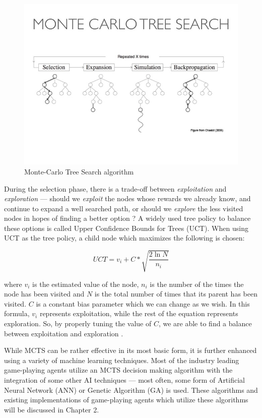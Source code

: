 \begin{figure}[h]
    \centering
    \includegraphics[clip, trim={0 4cm 0 5cm}, scale=.6]{images/mcts.jpg}
    \caption{Monte-Carlo Tree Search algorithm \cite{chaslot2008monte}}
    \label{fig:MCTS}
\end{figure}

During the selection phase, there is a trade-off between \textit{exploitation} and \textit{exploration} --- should we \textit{exploit} the nodes whose rewards we already know, and continue to expand a well searched path, or should we \textit{explore} the less visited nodes in hopes of finding a better option \cite{nakhost2009monte}?  A widely used tree policy to balance these options is called Upper Confidence Bounds for Trees (UCT).  When using UCT as the tree policy, a child node which maximizes the following is chosen:
    
\begin{equation}
    UCT = v_i + C * \sqrt{\frac{2\ln N}{n_i}}
\end{equation}
    
where $v_i$ is the estimated value of the node, $n_i$ is the number of the times the node has been visited and $N$ is the total number of times that its parent has been visited.  $C$ is a constant bias parameter which we can change as we wish.  In this formula, $v_i$ represents exploitation, while the rest of the equation represents exploration.  So, by properly tuning the value of $C$, we are able to find a balance between exploitation and exploration \cite{lucas2014fast}\cite{audibert2009exploration}.

While MCTS can be rather effective in its most basic form, it is further enhanced using a variety of machine learning techniques.  Most of the industry leading game-playing agents utilize an MCTS decision making algorithm with the integration of some other AI techniques --- most often, some form of Artificial Neural Network (ANN) or Genetic Algorithm (GA) is used.  These algorithms and existing implementations of game-playing agents which utilize these algorithms will be discussed in Chapter 2.

